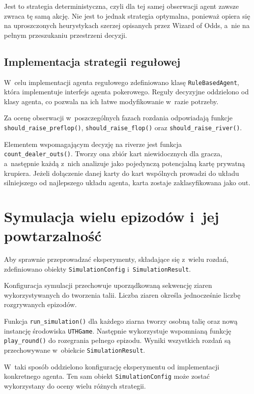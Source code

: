 Jest to strategia deterministyczna, czyli dla tej samej obserwacji agent
zawsze zwraca tę samą akcję. Nie jest to jednak strategia optymalna,
ponieważ opiera się na uproszczonych heurystykach
szerzej opisanych przez Wizard of Odds, a~nie na
pełnym przeszukaniu przestrzeni decyzji.

\subsection{Implementacja strategii regułowej}
\label{subsec:implementacja-agenta-regulowego}

W~celu implementacji agenta regułowego zdefiniowano klasę \texttt{RuleBasedAgent},
która implementuje interfejs agenta pokerowego. Reguły decyzyjne oddzielono od klasy agenta,
co pozwala na ich łatwe modyfikowanie w~razie potrzeby.

Za ocenę obserwacji w~poszczególnych fazach rozdania odpowiadają funkcje
\texttt{should\_raise\_preflop()}, \texttt{should\_raise\_flop()} oraz
\texttt{should\_raise\_river()}.

Elementem wspomagającym decyzję na riverze jest funkcja
\texttt{count\_dealer\_outs()}. Tworzy ona zbiór kart niewidocznych
dla gracza, a~następnie każdą z~nich analizuje jako pojedynczą
potencjalną kartę prywatną krupiera. Jeżeli dołączenie danej karty do
kart wspólnych prowadzi do układu silniejszego od najlepszego układu
agenta, karta zostaje zaklasyfikowana jako out.

\section{Symulacja wielu epizodów i~jej powtarzalność}
\label{sec:symulacja-wielu-epizodow}

Aby sprawnie przeprowadzać eksperymenty, składające się z~wielu rozdań,
zdefiniowano obiekty \texttt{SimulationConfig} i~\texttt{SimulationResult}.

Konfiguracja symulacji przechowuje uporządkowaną sekwencję ziaren
wykorzystywanych do tworzenia talii. Liczba ziaren określa jednocześnie
liczbę rozgrywanych epizodów.

Funkcja \texttt{run\_simulation()} dla każdego ziarna tworzy osobną
talię oraz nową instancję środowiska \texttt{UTHGame}. Następnie
wykorzystuje wspomnianą funkcję \texttt{play\_round()} do rozegrania pełnego
epizodu. Wyniki wszystkich rozdań są przechowywane w~obiekcie
\texttt{SimulationResult}.

W~taki sposób oddzielono konfigurację eksperymentu od implementacji
konkretnego agenta. Ten sam obiekt \texttt{SimulationConfig} może
zostać wykorzystany do oceny wielu różnych strategii.

